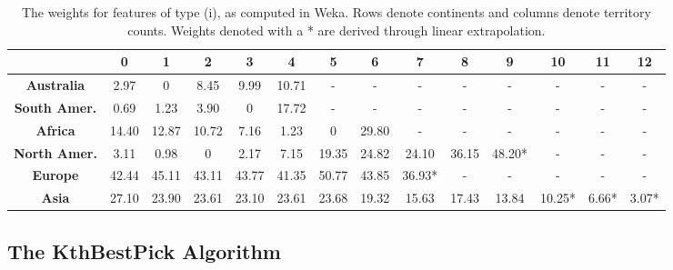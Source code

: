 \documentclass[letterpaper]{article}
\numberwithin{equation}{section}
\numberwithin{theorem}{section}
\numberwithin{lemma}{section}
\numberwithin{df}{section}
\begin{document}
\begin{table}[t]
 \centering
      \caption{The weights for features of type (i), as computed in Weka.  Rows denote continents and columns denote territory counts.  Weights denoted with a * are derived through linear extrapolation.}
    \label{tab:ContScoring}
    \begin{footnotesize}
    \begin{tabular}{|c|c|c|c|c|c|c|c|c|c|c|c|c|c|}
    	\hline
    	  & \bf 0 & \bf 1 & \bf 2  & \bf 3 & \bf 4 & \bf 5 & \bf 6 & \bf 7 & \bf 8 & \bf 9 & \bf 10 & \bf 11 & \bf 12 \\
    	 \hline
    	\bf Australia & 2.97 & 0 & 8.45 & 9.99 & 10.71 & - & - & - & - & - & - & - & - \\
    	\hline
    	\bf South Amer. & 0.69 & 1.23 & 3.90 & 0 & 17.72 & - & - & - & - & - & - & - & - \\
    	\hline
    	\bf Africa & 14.40 & 12.87 & 10.72 & 7.16 & 1.23 & 0 & 29.80 & - & - & - & - & - & - \\
    	\hline
    	\bf North Amer. & 3.11 & 0.98 & 0 & 2.17 & 7.15 & 19.35 & 24.82 & 24.10 & 36.15 & 48.20* & - & - & - \\
    	\hline
    	\bf Europe & 42.44 & 45.11 & 43.11 & 43.77 & 41.35 & 50.77 & 43.85 & 36.93* & - & - & - & - & - \\
    	\hline
    	\bf Asia & 27.10 & 23.90 & 23.61 & 23.10 & 23.61 & 23.68 & 19.32 & 15.63 & 17.43 & 13.84 & 10.25* & 6.66* & 3.07* \\
    	\hline
    \end{tabular}
    \end{footnotesize}
\end{table}

\subsection{The KthBestPick Algorithm}
\label{sec:KthBestPick}
\end{document}
